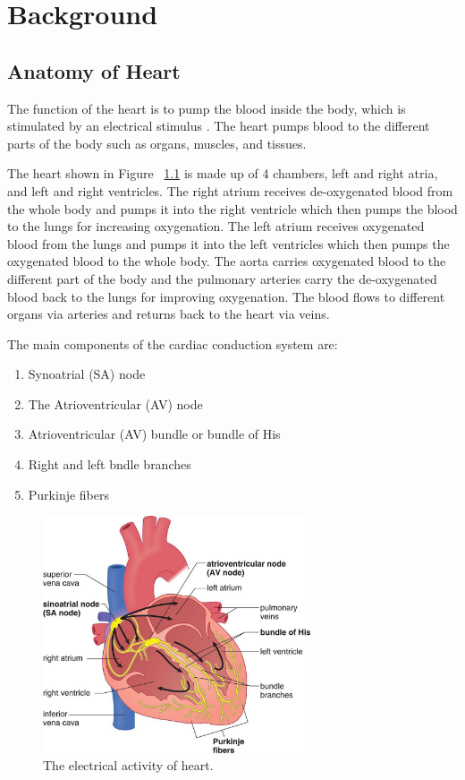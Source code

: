 \chapter{Background}


\section{Anatomy of Heart}
The function of the heart is to pump the blood inside the body, which is stimulated by an electrical stimulus \cite{wilkins2005ecg} \cite{electric_activity_heart}. The heart pumps blood to the different parts of the body such as organs, muscles, and tissues.

The heart shown in Figure ~\ref{fig:heart_anatomy} is made up of 4 chambers, left and right atria, and left and right ventricles. The right atrium receives de-oxygenated blood from the whole body and pumps it into the right ventricle which then pumps the blood to the lungs for increasing oxygenation. The left atrium receives oxygenated blood from the lungs and pumps it into the left ventricles which then pumps the oxygenated blood to the whole body. The aorta carries oxygenated blood to the different part of the body and the pulmonary arteries carry the de-oxygenated blood back to the lungs for improving oxygenation. The blood flows to different organs via arteries and returns back to the heart via veins.

The main components of the cardiac conduction system are:
\begin{enumerate}
	\item Synoatrial (SA) node
	\item The Atrioventricular (AV) node
	\item Atrioventricular (AV) bundle or bundle of His
	\item Right and left bndle branches
	\item Purkinje fibers
\end{enumerate}


\begin{figure}[htpb]
	\centering
	\includegraphics[width=\textwidth,height=7cm,keepaspectratio=true]{images/electric_activity_heart}
	\caption{
		The electrical activity of heart\cite{electric_activity_heart}.
	}
	\label{fig:heart_anatomy}
\end{figure}




